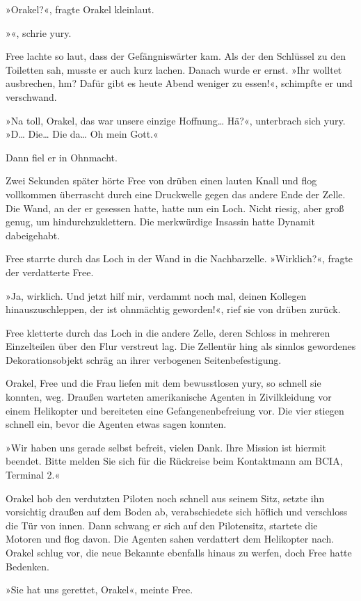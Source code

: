 »Orakel?«, fragte Orakel kleinlaut.

»«, schrie yury.

Free lachte so laut, dass der Gefängniswärter kam. Als der den Schlüssel zu den Toiletten sah, musste er auch kurz lachen. Danach wurde er ernst. »Ihr wolltet ausbrechen, hm? Dafür gibt es heute Abend weniger zu essen!«, schimpfte er und verschwand.

»Na toll, Orakel, das war unsere einzige Hoffnung… Hä?«, unterbrach sich yury. »D… Die… Die da… Oh mein Gott.«

Dann fiel er in Ohnmacht.

Zwei Sekunden später hörte Free von drüben einen lauten Knall und flog vollkommen überrascht durch eine Druckwelle gegen das andere Ende der Zelle. Die Wand, an der er gesessen hatte, hatte nun ein Loch. Nicht riesig, aber groß genug, um hindurchzuklettern. Die merkwürdige Insassin hatte Dynamit dabeigehabt.

Free starrte durch das Loch in der Wand in die Nachbarzelle. »Wirklich?«, fragte der verdatterte Free.

»Ja, wirklich. Und jetzt hilf mir, verdammt noch mal, deinen Kollegen hinauszuschleppen, der ist ohnmächtig geworden!«, rief sie von drüben zurück.

Free kletterte durch das Loch in die andere Zelle, deren Schloss in mehreren Einzelteilen über den Flur verstreut lag. Die Zellentür hing als sinnlos gewordenes Dekorationsobjekt schräg an ihrer verbogenen Seitenbefestigung.

Orakel, Free und die Frau liefen mit dem bewusstlosen yury, so schnell sie konnten, weg. Draußen warteten amerikanische Agenten in Zivilkleidung vor einem Helikopter und bereiteten eine Gefangenenbefreiung vor. Die vier stiegen schnell ein, bevor die Agenten etwas sagen konnten.

»Wir haben uns gerade selbst befreit, vielen Dank. Ihre Mission ist hiermit beendet. Bitte melden Sie sich für die Rückreise beim Kontaktmann am BCIA, Terminal 2.«

Orakel hob den verdutzten Piloten noch schnell aus seinem Sitz, setzte ihn vorsichtig draußen auf dem Boden ab, verabschiedete sich höflich und verschloss die Tür von innen. Dann schwang er sich auf den Pilotensitz, startete die Motoren und flog davon. Die Agenten sahen verdattert dem Helikopter nach. Orakel schlug vor, die neue Bekannte ebenfalls hinaus zu werfen, doch Free hatte Bedenken.

»Sie hat uns gerettet, Orakel«, meinte Free.


